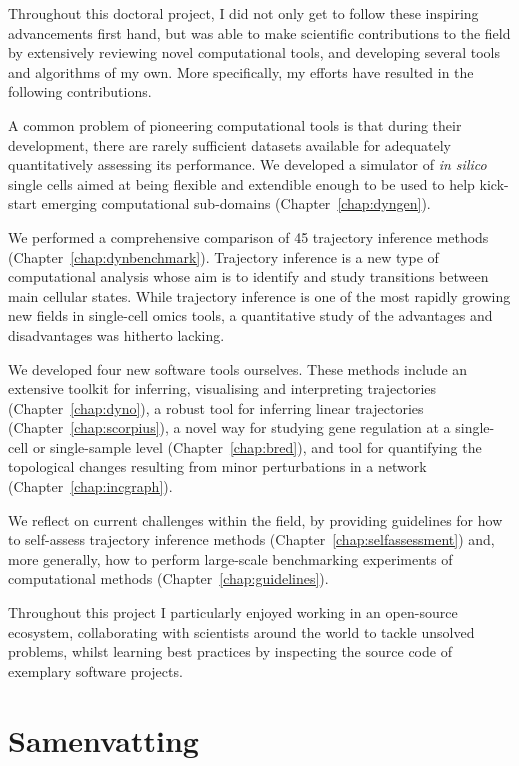 Throughout this doctoral project, I did not only get to follow these inspiring advancements first hand, but was able to make scientific contributions to the field by extensively reviewing novel computational tools, and developing several tools and algorithms of my own. More specifically, my efforts have resulted in the following contributions.

A common problem of pioneering computational tools is that during their development, there are rarely sufficient datasets available for adequately quantitatively assessing its performance. We developed a simulator of \textit{in silico} single cells aimed at being flexible and extendible enough to be used to help kick-start emerging computational sub-domains (Chapter~\ref{chap:dyngen}).

We performed a comprehensive comparison of 45 trajectory inference methods (Chapter~\ref{chap:dynbenchmark}). Trajectory inference is a new type of computational analysis whose aim is to identify and study transitions between main cellular states. While trajectory inference is one of the most rapidly growing new fields in single-cell omics tools, a quantitative study of the advantages and disadvantages was hitherto lacking.

We developed four new software tools ourselves. These methods include an extensive toolkit for inferring, visualising and interpreting trajectories (Chapter~\ref{chap:dyno}), a robust tool for inferring linear trajectories (Chapter~\ref{chap:scorpius}), a novel way for studying gene regulation at a single-cell or single-sample level (Chapter~\ref{chap:bred}), and tool for quantifying the topological changes resulting from minor perturbations in a network (Chapter~\ref{chap:incgraph}).

We reflect on current challenges within the field, by providing guidelines for how to self-assess trajectory inference methods (Chapter~\ref{chap:selfassessment}) and, more generally, how to perform large-scale benchmarking experiments of computational methods (Chapter~\ref{chap:guidelines}).

Throughout this project I particularly enjoyed working in an open-source ecosystem, collaborating with scientists around the world to tackle unsolved problems, whilst learning best practices by inspecting the source code of exemplary software projects. 


\chapter*{Samenvatting}


